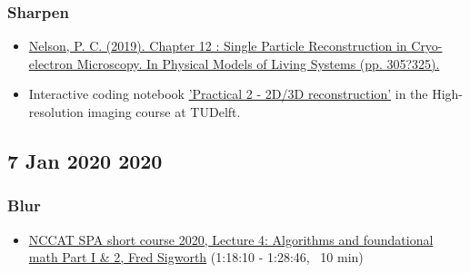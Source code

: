 \documentclass[11pt, oneside]{article}   	%
\begin{document}
\subsubsection{Sharpen}
\begin{itemize}
	\item \href{https://repository.upenn.edu/cgi/viewcontent.cgi?article=1665&context=physics_papers}{Nelson, P. C. (2019). Chapter 12 : Single Particle Reconstruction in Cryo-electron Microscopy. In Physical Models of Living Systems (pp. 305?325).}
	\item Interactive coding notebook \href{https://gitlab.tudelft.nl/aj-lab/teaching/-/wikis/NB4020}{'Practical 2 - 2D/3D reconstruction'} in the High-resolution imaging course at TUDelft.
\end{itemize}

\pagebreak
\subsection{7 Jan 2020 2020}
\subsubsection{Blur}
\begin{itemize}
	\item \href{https://youtu.be/tzv5c5K7MEk?t=4690}{NCCAT SPA short course 2020, Lecture 4: Algorithms and foundational math Part I \& 2, Fred Sigworth} (1:18:10 - 1:28:46, ~10 min)
	\end{itemize}
\end{document}
